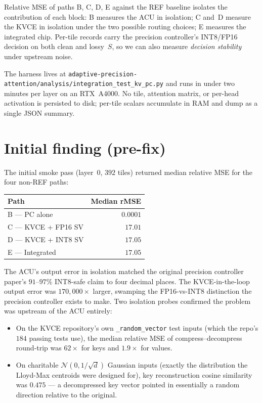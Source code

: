 \documentclass[11pt]{article}
\begin{document}
Relative MSE of paths B, C, D, E against the REF baseline isolates
the contribution of each block: B measures the ACU in isolation;
C and~D measure the KVCE in isolation under the two possible routing
choices; E measures the integrated chip. Per-tile records carry
the precision controller's INT8/FP16 decision on both clean and
lossy~$S$, so we can also measure \emph{decision stability}
under upstream noise.

The harness lives at
\texttt{adaptive-precision-attention/analysis/integration\_test\_kv\_pc.py}
and runs in under two minutes per layer on an RTX~A4000. No tile,
attention matrix, or per-head activation is persisted to disk; per-tile
scalars accumulate in RAM and dump as a single JSON summary.

\section{Initial finding (pre-fix)}
\label{sec:initial}

The initial smoke pass (layer~0, $392$ tiles) returned median
relative MSE for the four non-REF paths:

\begin{center}
\begin{tabular}{@{}lr@{}}
\toprule
Path & Median rMSE \\
\midrule
B --- PC alone & $0.0001$ \\
C --- KVCE + FP16 SV & $17.01$ \\
D --- KVCE + INT8 SV & $17.05$ \\
E --- Integrated & $17.05$ \\
\bottomrule
\end{tabular}
\end{center}

The ACU's output error in isolation matched the original precision
controller paper's $91$--$97\%$ INT8-safe claim to four decimal
places. The KVCE-in-the-loop output error was $170{,}000\times$
larger, swamping the FP16-vs-INT8 distinction the precision
controller exists to make. Two isolation probes confirmed the
problem was upstream of the ACU entirely:

\begin{itemize}
\item On the KVCE repository's own \texttt{\_random\_vector} test
      inputs (which the repo's $184$ passing tests use), the median
      relative MSE of compress--decompress round-trip was $62\times$
      for keys and $1.9\times$ for values.
\item On charitable $\mathcal{N}(0, 1/\sqrt{d})$ Gaussian inputs
      (exactly the distribution the Lloyd-Max centroids were
      designed for), key reconstruction cosine similarity was
      $0.475$ --- a decompressed key vector pointed in essentially
      a random direction relative to the original.
\end{itemize}
\end{document}
